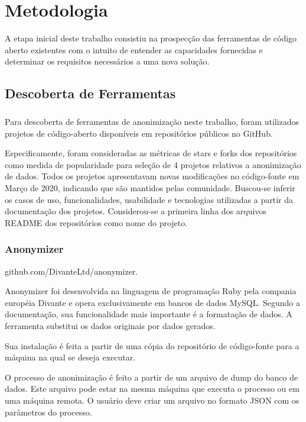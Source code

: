 \chapter{Metodologia}
\label{cap3}


A etapa inicial deste trabalho consistiu na prospecção das ferramentas de código aberto existentes com o intuito de entender
as capacidades fornecidas e determinar os requisitos necessários a uma nova solução.


\section{Descoberta de Ferramentas}

\paragraph{}
Para descoberta de ferramentas de anonimização neste trabalho, foram utilizados projetos de código-aberto disponíveis em repositórios públicos no GitHub. 

Especificamente, foram consideradas as métricas de stars e forks dos repositórios como medida de popularidade para seleção de 4 projetos relativos a anonimização de dados. Todos os projetos apresentavam novas modificações no código-fonte em Março de 2020, indicando que são mantidos pelas comunidade. Buscou-se inferir os casos de uso, funcionalidades, usabilidade e tecnologias utilizadas a partir da documentação dos projetos. Considerou-se a primeira linha dos arquivos README dos repositórios como nome do projeto.

\subsection{Anonymizer}

github.com/DivanteLtd/anonymizer.

Anonymizer foi desenvolvida na linguagem de programação Ruby pela compania européia Divante e opera exclusivamente em bancos de dados MySQL. Segundo a documentação, sua funcionalidade mais importante é a formatação de dados. A ferramenta substitui os dados originais por dados gerados.

Sua instalação é feita a partir de uma cópia do repositório de código-fonte para a máquina na qual se deseja executar.

O processo de anonimização é feito a partir de um arquivo de dump do banco de dados. Este arquivo pode estar na mesma máquina que executa o processo ou em uma máquina remota. O usuário deve criar um arquivo no formato JSON com os parâmetros do processo.

